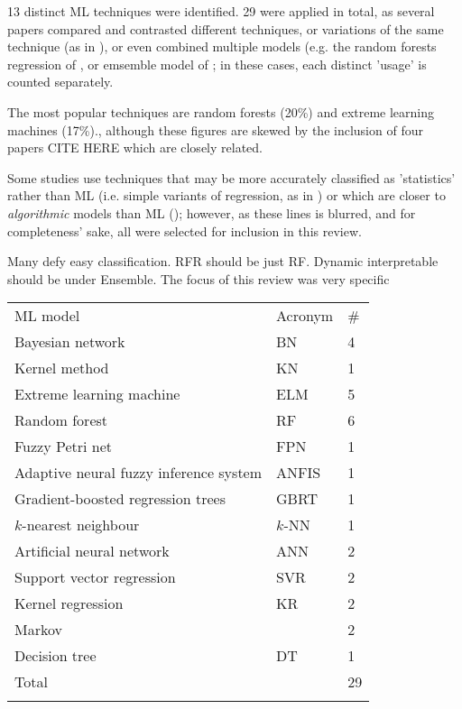 \documentclass{article}
\begin{document}
13 distinct ML techniques were identified. 29 were applied in total, as several papers compared and contrasted different techniques, or variations of the same technique (as in \cite{lessan_fu_wen_2019}\cite{oneto_fumeo_clerico_canepa_papa_dambra_mazzino_anguita_2016}\cite{milinkovic_markovic_veskovic_ivic_pavlovic_2013}\cite{markovic_milinkovic_tikhonov_schonfeld_2015}), or even combined multiple models (e.g. the random forests regression of \cite{wen_et_al_2017}, or emsemble model of \cite{nair_et_al_2019}; in these cases, each distinct 'usage' is counted separately. 

The most popular techniques are random forests (20\%) and extreme learning machines (17\%)., although these figures are skewed by the inclusion of four papers CITE HERE which are closely related.

Some studies use techniques that may be more accurately classified as 'statistics' rather than ML (i.e. simple variants of regression, as in \cite{pongnumkul_pechprasarn_kunaseth_chaipah_2014}\cite{wang_work_2015}) or which are closer to \textit{algorithmic} models than ML (\cite{hansen_goverde_van_der_meer_2010}); however, as these lines is blurred, and for completeness' sake, all were selected for inclusion in this review.

Many defy easy classification. RFR should be just RF. Dynamic interpretable should be under Ensemble.
The focus of this review was very specific

\begin{table}[h]
\begin{tabular}{lll}
\noalign{\smallskip}\hline \noalign{\smallskip}
ML model & Acronym & \# \\ 	\noalign{\smallskip}\hline \noalign{\smallskip}
Bayesian network & BN & 4 \\
Kernel method & KN & 1 \\
Extreme learning machine & ELM & 5 \\
Random forest & RF & 6 \\
Fuzzy Petri net & FPN & 1 \\
Adaptive neural fuzzy inference system & ANFIS & 1 \\
Gradient-boosted regression trees & GBRT & 1 \\
$k$-nearest neighbour & $k$-NN & 1 \\
Artificial neural network & ANN & 2 \\
Support vector regression & SVR & 2 \\
Kernel regression & KR & 2 \\
Markov &  & 2 \\
Decision tree & DT & 1 \\ 	\noalign{\smallskip}
Total                                    &         & 29	\\ \noalign{\smallskip} \hline
\end{tabular}
\end{table}
\end{document}
